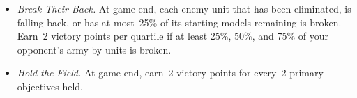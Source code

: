 \begin{itemize}
\item \textit{Break Their Back.}  At game end, each enemy unit that
  has been eliminated, is falling back, or has at most~25\% of its
  starting models remaining is broken.  Earn~2 victory points per
  quartile if at least 25\%, 50\%, and 75\% of your opponent's army by
  units is broken.

\item \textit{Hold the Field.}  At game end, earn~2 victory points
  for every~2 primary objectives held.

\end{itemize}

\tertiaries

\clearpage


\newcommand\toblocktitle{\setcounter{tomajor}{1}\toblocktitledraw}
\WithSuffix\newcommand\toblocktitle*{\toblocktitledraw}

\newcommand{\toblocktitledraw}{%
\renewcommand{\arraystretch}{1.2}%
\noindent\hfill\begin{tabular}{F{2em}F{1em}F{1em}F{1em}F{1in}m{4.7in}}%
{\bf \#} & \hbox to 10pt{\hspace{-2pt}\rotatebox{45}{\bf In Play}}  & \hbox to 10pt{\hspace{-2pt}\rotatebox{45}{\bf Achieved}} & \hbox to 10pt{\hspace{-2pt}\rotatebox{45}{\bf Value}} & {\bf Title} & {\bf Requirement} \\
\end{tabular}\hfill\hbox to 0pt{}
}

\newenvironment{toblock}
{%
\setcounter{tonum}{1}
\rowcolors{1}{gray!25}{white}%
\renewcommand{\arraystretch}{1.3}%
\noindent\hfill\begin{tabular}{|C{2em}C{1em}C{1em}C{1em}C{1in}m{4.7in}|}
\hline
}
{%
\hline
\end{tabular}\hfill\hbox to 0pt{}
\stepcounter{tomajor}
}

\newcommand{\toset}{\setcounter{tonum}{1}\stepcounter{tomajor}}

